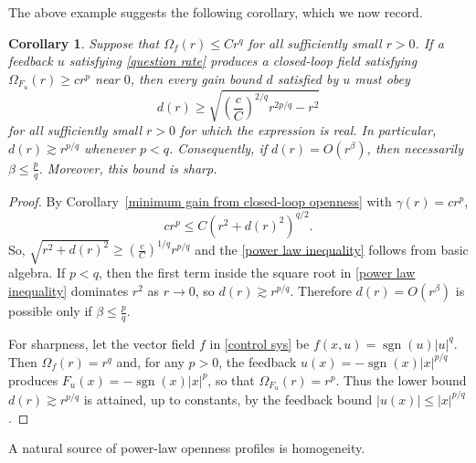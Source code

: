 \documentclass[pdflatex,sn-mathphys-num]{sn-jnl}%
\theoremstyle{thmstyleone}%
\newtheorem{corollary}[theorem]{Corollary}
\theoremstyle{thmstyletwo}%
\theoremstyle{thmstylethree}%
\begin{document}
    
    The above example suggests the following corollary, which we now record.


    \begin{corollary}\label{power law}
        Suppose that $\Omega_f(r)\leq Cr^q$ for all sufficiently small $ r >0 $.  If a feedback $u$ satisfying \eqref{question rate} produces a closed-loop field satisfying $\Omega_{F_u}(r)\geq cr^p$ near $0$, then every gain bound $d$ satisfied by $u$ must obey
        \begin{equation}\label{power law inequality}
            d(r)\geq \sqrt{\left(\frac{c}{C}\right)^{2/q}r^{2p/q}-r^2}
        \end{equation}
        for all sufficiently small $r>0$ for which the expression is real. In particular, $d(r)\gtrsim r^{p/q}$ whenever $p<q$. Consequently, if $d(r)=O(r^\beta)$, then necessarily $\beta\leq \frac{p}{q}$.  Moreover, this bound is sharp.
    \end{corollary}

    
    \begin{proof}
        By Corollary~\ref{minimum gain from closed-loop openness} with $\gamma(r)=cr^p$,
        \[
        cr^p \leq C\left(r^2+d(r)^2\right)^{q/2}.
        \]
        So, $\sqrt{r^2+d(r)^2} \geq \left(\frac{c}{C}\right)^{1/q}r^{p/q}$ and the \eqref{power law inequality} follows from basic algebra.  If $p<q$, then the first term inside the square root in \eqref{power law inequality} dominates $r^2$ as $r \to 0$, so $d(r)\gtrsim r^{p/q}$.  Therefore $d(r)=O(r^\beta)$ is possible only if $\beta\leq \frac{p}{q}$.

        For sharpness, let the vector field $f$ in \eqref{control sys} be $f(x,u)=\operatorname{sgn}(u)|u|^q$.  Then $\Omega_f(r)=r^q$ and, for any $p>0$, the feedback $u(x)=-\operatorname{sgn}(x)|x|^{p/q}$ produces $F_u(x)=-\operatorname{sgn}(x)|x|^p$, so that $\Omega_{F_u}(r)=r^p$.   Thus the lower bound $d(r)\gtrsim r^{p/q}$ is attained, up to constants, by the feedback bound $|u(x)|\leq |x|^{p/q}$.
    \end{proof}
    

    A natural source of power-law openness profiles is homogeneity.
    
\end{document}
